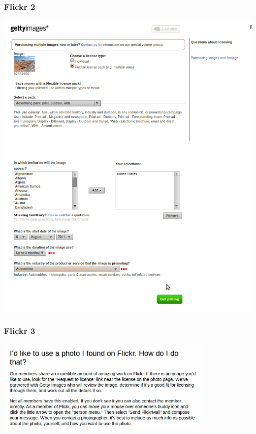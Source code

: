 \documentclass[mathserif,xcolor=dvipsnames,handout]{beamer}
\begin{document}
    \begin{frame}[t]
        \frametitle{Flickr 2}
        \begin{center}
            \includegraphics[height=0.8\textheight]{gettyimages-pricing.png}
        \end{center}
    \end{frame}
    \begin{frame}[t]
        \frametitle{Flickr 3}
        \begin{center}
            \includegraphics[width=0.8\textwidth]{i-would-like-to-use-a-photo-i-found-on-flickr.png}
        \end{center}
    \end{frame}
\end{document}
